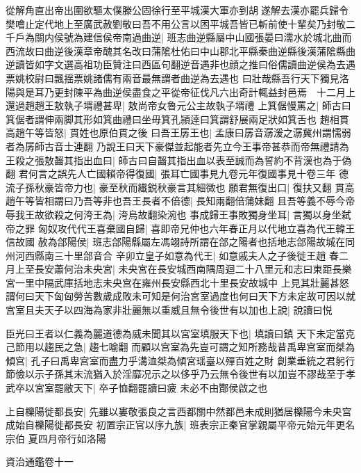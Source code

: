 從解角直出帝出圍欲驅太僕滕公固徐行至平城漢大軍亦到胡遂解去漢亦罷兵歸令樊噲止定代地上至廣武赦劉敬曰吾不用公言以困平城吾皆已斬前使十輩矣乃封敬二千戶為關内侯號為建信侯帝南過曲逆|{
	班志曲逆縣屬中山國張晏曰濡水於城北曲而西流故曰曲逆後漢章帝醜其名改曰蒲隂杜佑曰中山郡北平縣秦曲逆縣後漢蒲隂縣曲逆讀皆如字文選高祖功臣贊注曰西區句翻逆音遇非也顔之推曰俗儒讀曲逆侯為去遇票姚校尉曰飄揺票姚諸儒有兩音最無謂者曲逆為去遇也}
曰壯哉縣吾行天下獨見洛陽與是耳乃更封陳平為曲逆侯盡食之平從帝征伐凡六出奇計輒益封邑焉　十二月上還過趙趙王敖執子壻禮甚卑|{
	敖尚帝女魯元公主故執子壻禮}
上箕倨慢罵之|{
	師古曰箕倨者謂伸兩脚其形如箕曲禮曰坐毋箕孔頴逹曰箕謂舒展兩足狀如箕舌也}
趙相貫高趙午等皆怒|{
	貫姓也原伯貫之後}
曰吾王孱王也|{
	孟康曰孱音潺湲之潺冀州謂懦弱者為孱師古音士連翻}
乃說王曰天下豪傑並起能者先立今王事帝甚恭而帝無禮請為王殺之張敖齧其指出血曰|{
	師古曰自齧其指出血以表至誠而為誓約不背漢也為于偽翻}
君何言之誤先人亡國賴帝得復國|{
	張耳亡國事見九卷元年復國事見十卷三年}
德流子孫秋豪皆帝力也|{
	豪至秋而纎鋭秋豪言其細微也}
願君無復出口|{
	復扶又翻}
貫高趙午等皆相謂曰乃吾等非也吾王長者不倍德|{
	長知兩翻倍蒲妹翻}
且吾等義不辱今帝辱我王故欲殺之何洿王為|{
	洿烏故翻染涴也}
事成歸王事敗獨身坐耳|{
	言獨以身坐弑帝之罪}
匈奴攻代代王喜棄國自歸|{
	喜即帝兄仲也六年春正月以代地立喜為代王韓王信故國}
赦為郃陽侯|{
	班志郃陽縣屬左馮翊詩所謂在郃之陽者也括地志郃陽故城在同州河西縣南三十里郃音合}
辛卯立皇子如意為代王|{
	如意戚夫人之子後徙王趙}
春二月上至長安蕭何治未央宮|{
	未央宮在長安城西南隅周迴二十八里元和志曰東距長樂宮一里中隔武庫括地志未央宫在雍州長安縣西北十里長安故城中}
上見其壯麗甚怒謂何曰天下匈匈勞苦數歲成敗未可知是何治宮室過度也何曰天下方未定故可因以就宫室且夫天子以四海為家非壯麗無以重威且無令後世有以加也上說|{
	說讀曰悦}


臣光曰王者以仁義為麗道德為威未聞其以宮室填服天下也|{
	填讀曰鎮}
天下未定當克己節用以趨民之急|{
	趨七喻翻}
而顧以宫室為先豈可謂之知所務哉昔禹卑宫室而桀為傾宫|{
	孔子曰禹卑宫室而盡力乎溝洫桀為傾宮瑶臺以殫百姓之財}
創業垂統之君躬行節儉以示子孫其末流猶入於淫靡况示之以侈乎乃云無令後世有以加豈不謬哉至于孝武卒以宮室罷敝天下|{
	卒子恤翻罷讀曰疲}
未必不由酇侯啟之也

上自櫟陽徙都長安|{
	先雖以婁敬張良之言西都關中然都邑未成則猶居櫟陽今未央宫成始自櫟陽徙都長安}
初置宗正官以序九族|{
	班表宗正秦官掌親屬平帝元始元年更名宗伯}
夏四月帝行如洛陽

資治通鑑卷十一
